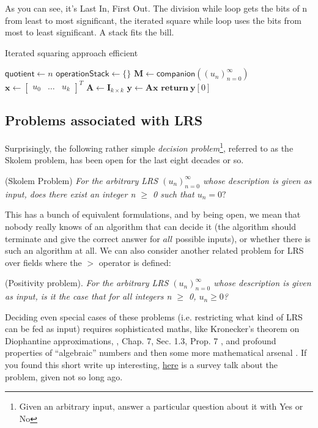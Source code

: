 \documentclass{article}
\newcommand{\leavespace}{\medskip \newline}
\begin{document}
As you can see, it’s Last In, First Out.
\leavespace
The division while loop gets the bits of n from least to most significant, the iterated square while loop uses the bits from most to least significant. A stack fits the bill.
\begin{algorithm}[!h]
\label{algo:3}
\caption{Iterated squaring approach efficient}
\SetAlgoLined
\DontPrintSemicolon
{}
$ \mathsf{quotient} \gets n$ \;
$ \mathsf{operationStack} \gets \{ \}$ \;
$ \mathbf{M} \gets \mathsf{companion}({(u_n)}^{\infty}_{n=0})$\;
$\mathbf{x} \gets \begin{bmatrix}
u_0 & \hdots & u_k 
\end{bmatrix} ^T$ \;
$\mathbf{A} \gets \mathbf{I}_{k\times k} $\;
$\mathbf{y \gets Ax}$\;
$\mathbf{return ~y}[0]$\;
\end{algorithm}
\subsection{Problems associated with LRS}
Surprisingly, the following rather simple \textit{decision problem}\footnote{Given an arbitrary input, answer a particular question about it with Yes or No}, referred to as the Skolem problem, has been open for the last eight decades or so.
\begin{defn}
 (Skolem Problem) \textit{For the arbitrary LRS $(u_n)^\infty_{n=0}$ whose description is given as
input, does there exist an integer n $\geq$ 0 such that $u_n = 0? $}
\end{defn}
This has a bunch of equivalent formulations, and by being open, we mean that nobody really knows of an algorithm that can decide it (the algorithm should terminate and give the correct answer for $all$ possible inputs), or whether there is such an algorithm at all. \newline
We can also consider another related problem for LRS over fields where the $>$ operator is defined:

\begin{defn}
(Positivity problem). \textit{For the arbitrary LRS $(u_n)^\infty_{n=0}$ whose description is given
as input, is it the case that for all integers n $\geq$ 0, $u_n \ge 0$?}
\end{defn}
Deciding even special cases of these problems (i.e. restricting what kind of LRS can be fed as
input) requires sophisticated maths, like Kronecker’s theorem on Diophantine approximations, \cite{Bour}, Chap. 7, Sec. 1.3, Prop. 7
, and profound properties of “algebraic” numbers \cite{Mig} and then some
more mathematical arsenal \cite{Bell, Ren}.
\leavespace
If you found this short write up interesting, \href{https://fmindia.cmi.ac.in/update2013/presentations/S-Akshay.pdf}{here} is a survey talk about the problem, given not so
long ago.
\vfill
\end{document}
